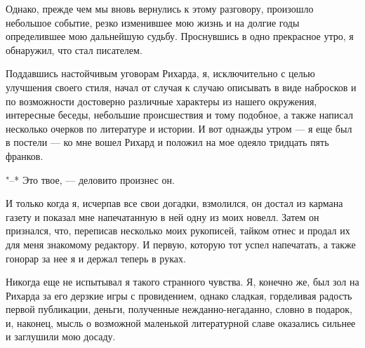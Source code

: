 Однако, прежде  чем мы  вновь вернулись  к этому  разговору, произошло
небольшое  событие,  резко  изменившее  мою жизнь  и  на  долгие  годы
определившее  мою дальнейшую  судьбу.  Проснувшись  в одно  прекрасное
утро, я обнаружил, что стал писателем.

Поддавшись  настойчивым уговорам  Рихарда,  я,  исключительно с  целью
улучшения  своего стиля,  начал от  случая к  случаю описывать  в виде
набросков и  по возможности  достоверно различные характеры  из нашего
окружения, интересные беседы, небольшие  происшествия и тому подобное,
а  также написал  несколько очерков  по  литературе и  истории. И  вот
однажды  утром ---  я еще  был в  постели ---  ко мне  вошел Рихард  и
положил на мое одеяло тридцать пять франков.

"--* Это твое, --- деловито произнес он.

И только когда  я, исчерпав все свои догадки, взмолился,  он достал из
кармана газету и  показал мне напечатанную в ней одну  из моих новелл.
Затем он  признался, что,  переписав несколько моих  рукописей, тайком
отнес и продал их для меня  знакомому редактору. И первую, которую тот
успел напечатать, а также гонорар за нее я и держал теперь в руках.

Никогда еще  не испытывал я  такого странного чувства. Я,  конечно же,
был  зол  на  Рихарда  за  его  дерзкие  игры  с  провидением,  однако
сладкая,  горделивая  радость  первой публикации,  деньги,  полученные
нежданно-негаданно, словно  в подарок,  и, наконец, мысль  о возможной
маленькой литературной славе оказались сильнее и заглушили мою досаду.

